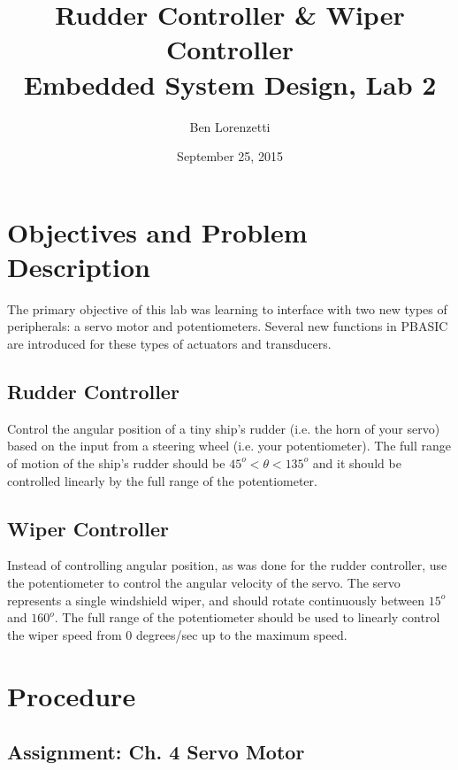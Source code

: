 \documentclass[11pt]{article}
\begin{document}
\title{Rudder Controller \& Wiper Controller\\Embedded System Design, Lab 2}
\date{September 25, 2015}
\author{Ben Lorenzetti}
\maketitle
\tableofcontents

\clearpage

\section{Objectives and Problem Description}

The primary objective of this lab was learning to interface with two new types of peripherals: a servo motor and potentiometers.
Several new functions in PBASIC are introduced for these types of actuators and transducers.

\subsection{Rudder Controller}

Control the angular position of a tiny ship's rudder (i.e. the horn of your servo)
based on the input from a steering wheel (i.e. your potentiometer).
The full range of motion of the ship's rudder should be $45^{o}<\theta<135^{o}$
and it should be controlled linearly by the full range of the potentiometer.

\subsection{Wiper Controller}

Instead of controlling angular position, as was done for the rudder controller,
use the potentiometer to control the angular velocity of the servo.
The servo represents a single windshield wiper, and should rotate continuously
between $15^{o}$ and $160^{o}$. The full range of the potentiometer should
be used to linearly control the wiper speed from 0 degrees/sec up to the
maximum speed.

\section{Procedure}
\subsection{Assignment: Ch. 4 Servo Motor}
\end{document}
